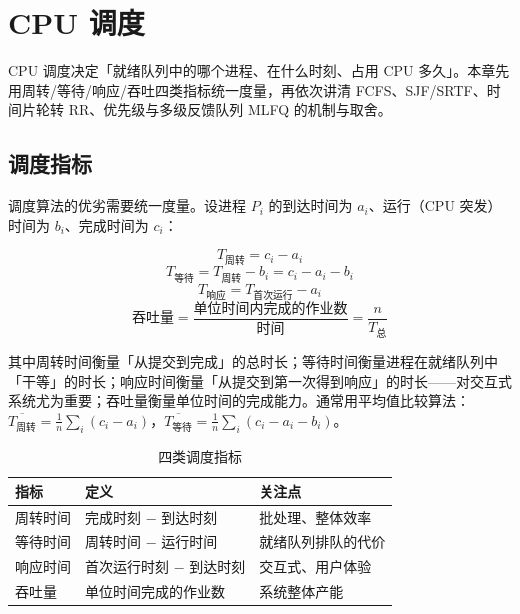\clearpage
\begingroup
\let\clearpage\relax
\let\cleardoublepage\relax
\vspace*{\fill}
\chapter{CPU 调度}
\begin{center}
CPU 调度决定「就绪队列中的哪个进程、在什么时刻、占用 CPU 多久」。本章先用周转/等待/响应/吞吐四类指标统一度量，再依次讲清 FCFS、SJF/SRTF、时间片轮转 RR、优先级与多级反馈队列 MLFQ 的机制与取舍。
\end{center}
\vspace*{\fill}
\endgroup
\clearpage

\section{调度指标}

调度算法的优劣需要统一度量。设进程 $P_i$ 的到达时间为 $a_i$、运行（CPU 突发）时间为 $b_i$、完成时间为 $c_i$：

\begin{equation}
    T_{\text{周转}} = c_i - a_i
\end{equation}
\begin{equation}
    T_{\text{等待}} = T_{\text{周转}} - b_i = c_i - a_i - b_i
\end{equation}
\begin{equation}
    T_{\text{响应}} = T_{\text{首次运行}} - a_i
\end{equation}
\begin{equation}
    \text{吞吐量} = \frac{\text{单位时间内完成的作业数}}{\text{时间}} = \frac{n}{T_{\text{总}}}
\end{equation}

其中周转时间衡量「从提交到完成」的总时长；等待时间衡量进程在就绪队列中「干等」的时长；响应时间衡量「从提交到第一次得到响应」的时长——对交互式系统尤为重要；吞吐量衡量单位时间的完成能力。通常用平均值比较算法：$\overline{T_{\text{周转}}} = \frac{1}{n}\sum_i (c_i - a_i)$，$\overline{T_{\text{等待}}} = \frac{1}{n}\sum_i (c_i - a_i - b_i)$。

\begin{table}[H]
\centering
\caption{四类调度指标}
\begin{tabulary}{\textwidth}{LLL}
\toprule
指标 & 定义 & 关注点 \\
\midrule
周转时间 & 完成时刻 $-$ 到达时刻 & 批处理、整体效率 \\
等待时间 & 周转时间 $-$ 运行时间 & 就绪队列排队的代价 \\
响应时间 & 首次运行时刻 $-$ 到达时刻 & 交互式、用户体验 \\
吞吐量 & 单位时间完成的作业数 & 系统整体产能 \\
\bottomrule
\end{tabulary}
\end{table}

